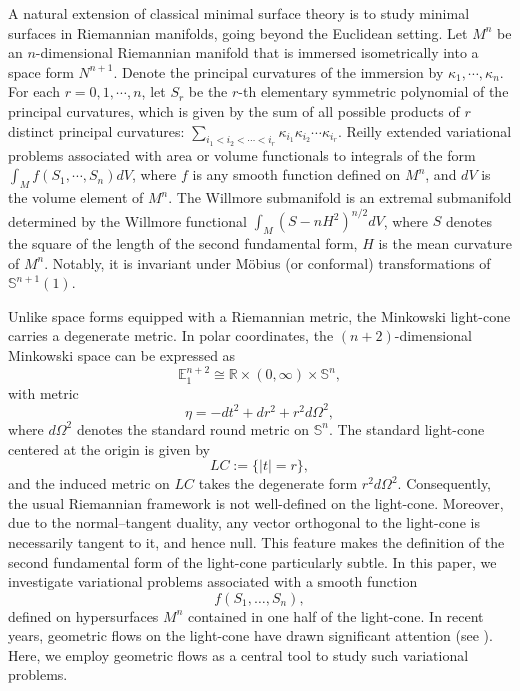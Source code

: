 \documentclass[reqno,11pt, letterpaper]{amsart}
\theoremstyle{plain}
\theoremstyle{definition}
\def\Bbb#1{{\mathbb#1}}
\def\S{\Bbb S}
\numberwithin{equation}{section}
\begin{document}
A natural extension of classical minimal surface theory is to study minimal surfaces in Riemannian manifolds, going beyond the Euclidean setting.
Let $M^n$ be an $n$-dimensional Riemannian manifold that is immersed isometrically into a space form $N^{n+1}$.
Denote the principal curvatures of the immersion by $\kappa_1,\cdots,\kappa_n$. For each $r=0,1,\cdots, n$, let $S_r$
be the $r$-th elementary symmetric polynomial of the principal curvatures, which is given by the sum of all possible products of $r$ distinct principal curvatures: $\displaystyle \sum_{i_1<i_2<\cdots<i_r}\kappa_{i_1}\kappa_{i_2}\cdots\kappa_{i_r}$.
Reilly \cite{rei} extended variational problems associated with area or volume functionals to integrals of the form $\displaystyle \int_Mf(S_1,\cdots,S_n)dV$, where $f$ is any smooth function defined on $M^n$, and $dV$ is the volume element of $M^n$.
The Willmore submanifold \cite{bry}  is an extremal submanifold determined by the Willmore
functional $\displaystyle \int_M (S-nH^2)^{n/2}dV$, where $S$  denotes the square of the length of the second fundamental
form, $H$ is the mean curvature of $M^n$. Notably, it is invariant under M\"obius (or conformal) transformations of $\mathbb{S}^{n+1}(1)$.

Unlike space forms equipped with a Riemannian metric, 
the Minkowski light-cone carries a degenerate metric. 
In polar coordinates, the $(n+2)$-dimensional Minkowski space can be expressed as  
\[
\mathbb{E}^{n+2}_1 \cong \mathbb{R} \times (0,\infty) \times \S^n,
\]  
with metric  
\[
\eta = -dt^2 + dr^2 + r^2 d\Omega^2,
\]  
where \(d\Omega^2\) denotes the standard round metric on \(\S^n\). 
The standard light-cone centered at the origin is given by  
\[
LC := \{|t| = r\},
\]  
and the induced metric on \(LC\) takes the degenerate form \(r^2 d\Omega^2\). 
Consequently, the usual Riemannian framework is not well-defined on the light-cone. 
Moreover, due to the normal–tangent duality, any vector orthogonal to the light-cone is necessarily tangent to it, and hence null. This feature makes the definition of the second fundamental form of the light-cone particularly subtle. In this paper, we investigate variational problems associated with a smooth function  
\[
f(S_1, \dots, S_n),
\]  
defined on hypersurfaces \(M^n\) contained in one half of the light-cone. 
In recent years, geometric flows on the light-cone have drawn significant attention 
(see \cite{rs, wol}). 
Here, we employ geometric flows as a central tool to study such variational problems.
\end{document}

